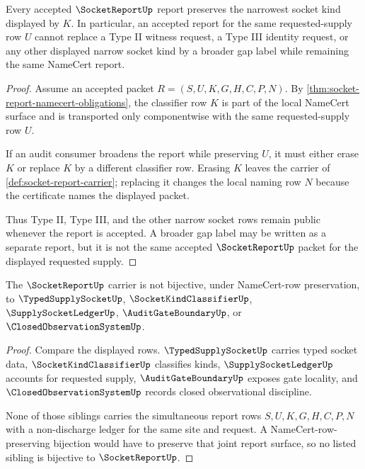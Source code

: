 \begin{theorem}
\label{thm:socket-report-minimal-classification}
Every accepted $\SocketReportUp$ report preserves the narrowest socket kind displayed by $K$. In particular, an accepted report for the same requested-supply row $U$ cannot replace a Type II witness request, a Type III identity request, or any other displayed narrow socket kind by a broader gap label while remaining the same NameCert report.
\end{theorem}
\begin{proof}
Assume an accepted packet $R=(S,U,K,G,H,C,P,N)$. By \autoref{thm:socket-report-namecert-obligations}, the classifier row $K$ is part of the local NameCert surface and is transported only componentwise with the same requested-supply row $U$.

If an audit consumer broadens the report while preserving $U$, it must either erase $K$ or replace $K$ by a different classifier row. Erasing $K$ leaves the carrier of \autoref{def:socket-report-carrier}; replacing it changes the local naming row $N$ because the certificate names the displayed packet.

Thus Type II, Type III, and the other narrow socket rows remain public whenever the report is accepted. A broader gap label may be written as a separate report, but it is not the same accepted $\SocketReportUp$ packet for the displayed requested supply.
\end{proof}

\begin{theorem}
\label{thm:socket-report-sibling-separation}
The $\SocketReportUp$ carrier is not bijective, under NameCert-row preservation, to $\TypedSupplySocketUp$, $\SocketKindClassifierUp$, $\SupplySocketLedgerUp$, $\AuditGateBoundaryUp$, or $\ClosedObservationSystemUp$.
\end{theorem}
\begin{proof}
Compare the displayed rows. $\TypedSupplySocketUp$ carries typed socket data, $\SocketKindClassifierUp$ classifies kinds, $\SupplySocketLedgerUp$ accounts for requested supply, $\AuditGateBoundaryUp$ exposes gate locality, and $\ClosedObservationSystemUp$ records closed observational discipline.

None of those siblings carries the simultaneous report rows $S,U,K,G,H,C,P,N$ with a non-discharge ledger for the same site and request. A NameCert-row-preserving bijection would have to preserve that joint report surface, so no listed sibling is bijective to $\SocketReportUp$.
\end{proof}


